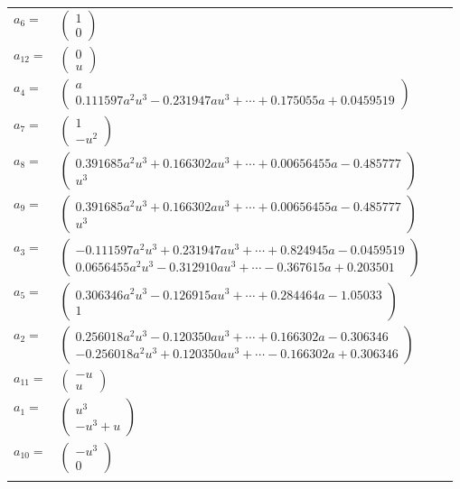 \documentclass[1p]{elsarticle_modified}
\theoremstyle{definition}
\begin{document}
\begin{tabular}{m{7pt} m{180pt} m{7pt} m{180pt} }
\flushright $a_{6}=$&$\begin{pmatrix}1\\0\end{pmatrix}$ \\
\flushright $a_{12}=$&$\begin{pmatrix}0\\u\end{pmatrix}$ \\
\flushright $a_{4}=$&$\begin{pmatrix}a\\0.111597 a^{2} u^{3}-0.231947 a u^{3}+\cdots+0.175055 a+0.0459519\end{pmatrix}$ \\
\flushright $a_{7}=$&$\begin{pmatrix}1\\- u^2\end{pmatrix}$ \\
\flushright $a_{8}=$&$\begin{pmatrix}0.391685 a^{2} u^{3}+0.166302 a u^{3}+\cdots+0.00656455 a-0.485777\\u^3\end{pmatrix}$ \\
\flushright $a_{9}=$&$\begin{pmatrix}0.391685 a^{2} u^{3}+0.166302 a u^{3}+\cdots+0.00656455 a-0.485777\\u^3\end{pmatrix}$ \\
\flushright $a_{3}=$&$\begin{pmatrix}-0.111597 a^{2} u^{3}+0.231947 a u^{3}+\cdots+0.824945 a-0.0459519\\0.0656455 a^{2} u^{3}-0.312910 a u^{3}+\cdots-0.367615 a+0.203501\end{pmatrix}$ \\
\flushright $a_{5}=$&$\begin{pmatrix}0.306346 a^{2} u^{3}-0.126915 a u^{3}+\cdots+0.284464 a-1.05033\\1\end{pmatrix}$ \\
\flushright $a_{2}=$&$\begin{pmatrix}0.256018 a^{2} u^{3}-0.120350 a u^{3}+\cdots+0.166302 a-0.306346\\-0.256018 a^{2} u^{3}+0.120350 a u^{3}+\cdots-0.166302 a+0.306346\end{pmatrix}$ \\
\flushright $a_{11}=$&$\begin{pmatrix}- u\\u\end{pmatrix}$ \\
\flushright $a_{1}=$&$\begin{pmatrix}u^3\\- u^3+u\end{pmatrix}$ \\
\flushright $a_{10}=$&$\begin{pmatrix}- u^3\\0\end{pmatrix}$\\&\end{tabular}
\end{document}
